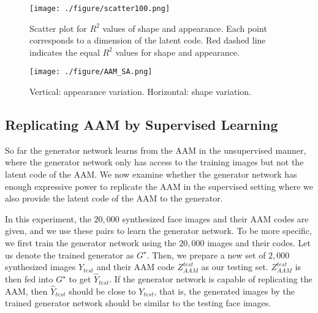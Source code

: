 \documentclass{article}
\begin{document}
\begin{figure}[h]
	\begin{center}
		\texttt{[image: ./figure/scatter100.png]}
		\caption{Scatter plot for $R^2$ values of shape and appearance. Each point corresponds to a dimension of the latent code. Red dashed line indicates the equal $R^2$ values for shape and appearance. }
		\label{fig:scatterSA}
	\end{center}
\end{figure}

\begin{figure}[h]
	\begin{center}
		\texttt{[image: ./figure/AAM\_SA.png]}
		\caption{Vertical: appearance variation. Horizontal: shape variation.}
		\label{fig:AAM_variation}
	\end{center}
\end{figure}

\subsection{Replicating AAM by Supervised Learning}

So far the generator network learns from the AAM in the unsupervised manner, where the generator network only has access to the training images but not the latent code of the AAM.
 We now examine whether the generator network has enough expressive power to replicate the AAM in the supervised setting where we also provide the latent code of the AAM to the generator.

In this experiment, the $20,000$ synthesized face images and their AAM codes are given, and we use these pairs to learn the generator network. To be more specific, we first train the generator network using the $20,000$ images and their codes. Let us denote the trained generator as $G^\star$. Then, we prepare a new set of $2,000$ synthesized images $Y_{test}$ and their AAM code $Z^{test}_{AAM}$ as our testing set. $Z^{test}_{AAM}$ is then fed into $G^\star$ to get $\hat{Y}_{test}$. If the generator network is capable of replicating the AAM, then $\hat{Y}_{test}$ should be close to $Y_{test}$, that is, the generated images by the trained generator network should be similar to the testing face images.
\end{document}
